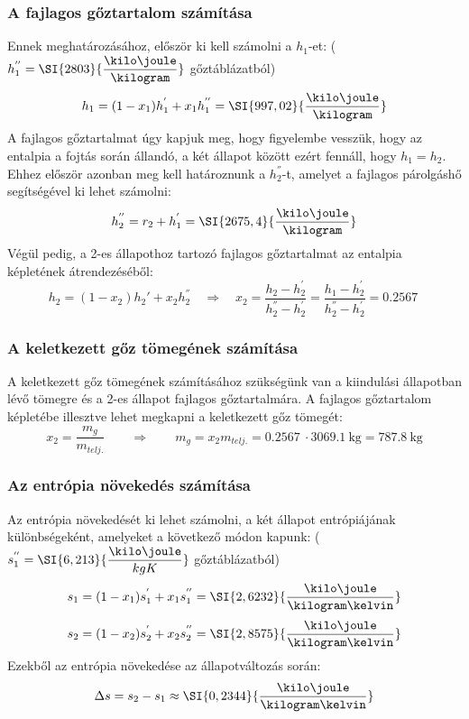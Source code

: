 \subsubsection{A fajlagos gőztartalom számítása}
Ennek meghatározásához, először ki kell számolni a $h_{1}$-et: ($h_{1}^{''} = \SI{2803}{\dfrac{\kilo\joule}{\kilogram}}$ gőztáblázatból)
\begin{equation}
	h_{1}
	=
	(1 - x_{1})h_{1}^{'} + x_{1}h_{1}^{''}
	=
	\SI{997,02}{\dfrac{\kilo\joule}{\kilogram}}
\end{equation}
A fajlagos gőztartalmat úgy kapjuk meg, hogy figyelembe vesszük, hogy az entalpia a fojtás során állandó, a két állapot között ezért fennáll, hogy $h_{1} = h_{2}$. Ehhez először azonban meg kell határoznunk a $h_{2}^{''}$-t, amelyet a fajlagos párolgáshő segítségével ki lehet számolni:
\begin{equation}
	h_{2}^{''} = r_{2} + h_{1}^{'}
	=
	\SI{2675,4}{\dfrac{\kilo\joule}{\kilogram}}
\end{equation}
\tab Végül pedig, a 2-es állapothoz tartozó fajlagos gőztartalmat az entalpia képletének átrendezéséből:
\begin{equation}
	h_{2} = \left(1 - x_{2}\right) h_{2}' + x_{2} h_{2}^{''}
	\quad 
	\Rightarrow
	\quad 
	x_{2}
	= 
	\dfrac{h_{2} - h_{2}^{'}}{h_{2}^{''} - h_{2}^{'}} 
	=
	\dfrac{h_{1} - h_{2}^{'}}{h_{2}^{''} - h_{2}^{'}} 
	= 
	\SI{0,2567}{}
\end{equation}

\subsubsection{A keletkezett gőz tömegének számítása}
A keletkezett gőz tömegének számításához szükségünk van a kiindulási állapotban lévő tömegre és a 2-es állapot fajlagos gőztartalmára. A fajlagos gőztartalom képletébe illesztve lehet megkapni a keletkezett gőz tömegét:
\begin{equation}
	x_{2} = \dfrac{m_{g}}{m_{telj.}}
	\qquad
	\Rightarrow
	\qquad
	m_{g} = x_{2}m_{telj.}
	=
	\SI{0,2567}{}\cdot\SI{3069,1}{\kilogram}
	=
	\SI{787,8}{\kilogram}
\end{equation}


\subsubsection{Az entrópia növekedés számítása}
Az entrópia növekedését ki lehet számolni, a két állapot entrópiájának különbségeként, amelyeket a következő módon kapunk:
($s_{1}^{''} = \SI{6,213}{\dfrac{\kilo\joule}{kgK}}$ gőztáblázatból)
\begin{equation}
	s_{1}
	=
	(1-x_{1})s_{1}^{'} + x_{1}s_{1}^{''}
	=
	\SI{2,6232}{\dfrac{\kilo\joule}{\kilogram\kelvin}}
\end{equation}
\begin{equation}
	s_{2}
	=
	(1-x_{2})s_{2}^{'} + x_{2}s_{2}^{''}
	=
	\SI{2,8575}{\dfrac{\kilo\joule}{\kilogram\kelvin}}
\end{equation}
\tab Ezekből az entrópia növekedése az állapotváltozás során:
\begin{equation}
	\Delta s = s_{2} - s_{1}\approx \SI{0,2344}{\dfrac{\kilo\joule}{\kilogram\kelvin}}
\end{equation}

